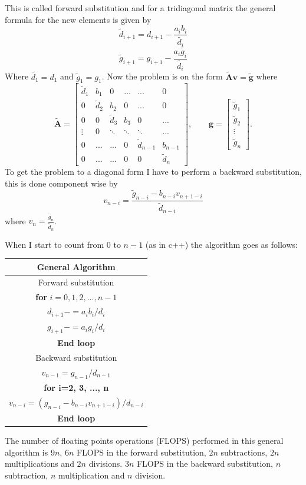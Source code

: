 \documentclass[12pt]{article}
\begin{document}
This is called forward substitution and for a tridiagonal matrix the general formula for the new elements is given by
$$\tilde{d}_{i+1}=d_{i+1}-\frac{a_ib_i}{\tilde{d_i}}$$  $$\tilde{g}_{i+1}=g_{i+1}-\frac{a_i\tilde{g_i}}{\tilde{d_i}}$$ Where $\tilde{d_1}=d_1$ and $\tilde{g}_1=g_1$. Now the problem is on the form $\mathbf{\tilde{A}}\mathbf{v}=\mathbf{\tilde{g}}$ where $$
\mathbf{\tilde{A}}=  \begin{bmatrix}
 \tilde{d}_1 & b_1 & 0 & \dots & ... & 0 \\
 0 &\tilde{d}_2 & b_2 & 0 & ... & 0 \\
 0  & 0 & \tilde{d}_3 & b_3 & 0 & ... \\
 \vdots & 0 & \ddots & \ddots & \ddots & ...\\
 0 & ... & ... & 0 & \tilde{d}_{n-1} & b_{n-1}\\
 0 & ... & ... & 0 & 0 & \tilde{d}_{n} 
\end{bmatrix}, \qquad \mathbf{g}=\begin{bmatrix}
 \tilde{g}_1 \\ \tilde{g}_2 \\ \vdots \\ \tilde{g}_n
\end{bmatrix}.
$$
To get the problem to a diagonal form I have to perform a backward substitution, this is done component wise by 
$$v_{n-i}=\frac{\tilde{g}_{n-i}-b_{n-i}v_{n+1-i}}{\tilde{d}_{n-i}}$$ where $v_{n}=\frac{\tilde{g}_n}{\tilde{d}_n}$. 

When I start to count from 0 to $n-1$ (as in c++) the algorithm goes as follows:

\begin{center}
  \begin{tabular}{||c||}
    \hline\hline
    \textbf{General Algorithm}\\
    \hline\hline
    Forward substitution \\
    \textbf{for} $i=0,1,2,...,n-1$\\
      $d_{i+1}-=a_ib_i/d_i$ \\
      $g_{i+1}-=a_ig_i/d_i$ \\
      \textbf{End loop} \\
      Backward substitution \\
      $v_{n-1}=g_{n-1}/d_{n-1}$\\
      \textbf{for i=2, 3, ..., n} \\
      $v_{n-i}=(g_{n-i}-b_{n-i}v_{n+1-i})/d_{n-i}$\\ 
      \textbf{End loop}\\
      \hline\hline
  \end{tabular}
\end{center}
The number of floating points operations (FLOPS) performed in this general algorithm is $9n$, $6n$ FLOPS in the forward substitution, $2n$ subtractions, $2n$ multiplications and $2n$ divisions. $3n$ FLOPS in the backward substitution, $n$ subtraction, $n$ multiplication and $n$ division.
\end{document}
